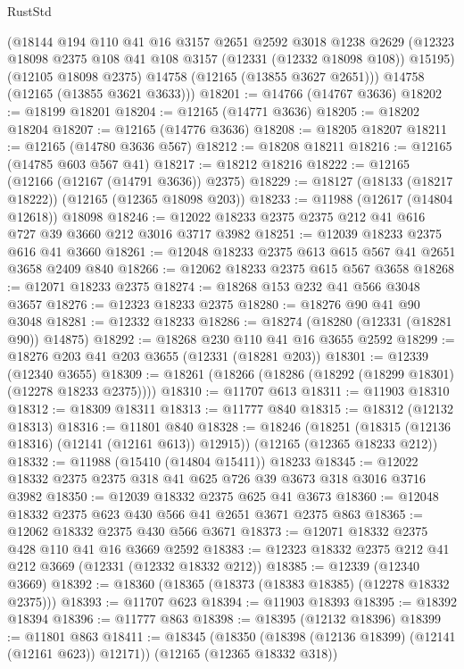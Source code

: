 \begin{lexlean}{RustStd}
\begin{coremodule}
      (@18144
        @194
        @110
        @41
        @16
        @3157
        @2651
        @2592
        @3018
        @1238
        @2629
        (@12323 @18098 @2375 @108 @41 @108 @3157 (@12331 (@12332 @18098 @108)) @15195)
        (@12105 @18098 @2375)
        @14758
        (@12165 (@13855 @3627 @2651)))
      @14758
      (@12165 (@13855 @3621 @3633)))
@18201 := @14766 (@14767 @3636)
@18202 := @18199 @18201
@18204 := @12165 (@14771 @3636)
@18205 := @18202 @18204
@18207 := @12165 (@14776 @3636)
@18208 := @18205 @18207
@18211 := @12165 (@14780 @3636 @567)
@18212 := @18208 @18211
@18216 := @12165 (@14785 @603 @567 @41)
@18217 := @18212 @18216
@18222 := @12165 (@12166 (@12167 (@14791 @3636)) @2375)
@18229 := @18127 (@18133 (@18217 @18222)) (@12165 (@12365 @18098 @203))
@18233 := @11988 (@12617 (@14804 @12618)) @18098
@18246 := @12022 @18233 @2375 @2375 @212 @41 @616 @727 @39 @3660 @212 @3016 @3717 @3982
@18251 := @12039 @18233 @2375 @616 @41 @3660
@18261 := @12048 @18233 @2375 @613 @615 @567 @41 @2651 @3658 @2409 @840
@18266 := @12062 @18233 @2375 @615 @567 @3658
@18268 := @12071 @18233 @2375
@18274 := @18268 @153 @232 @41 @566 @3048 @3657
@18276 := @12323 @18233 @2375
@18280 := @18276 @90 @41 @90 @3048
@18281 := @12332 @18233
@18286 := @18274 (@18280 (@12331 (@18281 @90)) @14875)
@18292 := @18268 @230 @110 @41 @16 @3655 @2592
@18299 := @18276 @203 @41 @203 @3655 (@12331 (@18281 @203))
@18301 := @12339 (@12340 @3655)
@18309 := @18261 (@18266 (@18286 (@18292 (@18299 @18301) (@12278 @18233 @2375))))
@18310 := @11707 @613
@18311 := @11903 @18310
@18312 := @18309 @18311
@18313 := @11777 @840
@18315 := @18312 (@12132 @18313)
@18316 := @11801 @840
@18328 := @18246
    (@18251 (@18315 (@12136 @18316) (@12141 (@12161 @613)) @12915))
    (@12165 (@12365 @18233 @212))
@18332 := @11988 (@15410 (@14804 @15411)) @18233
@18345 := @12022 @18332 @2375 @2375 @318 @41 @625 @726 @39 @3673 @318 @3016 @3716 @3982
@18350 := @12039 @18332 @2375 @625 @41 @3673
@18360 := @12048 @18332 @2375 @623 @430 @566 @41 @2651 @3671 @2375 @863
@18365 := @12062 @18332 @2375 @430 @566 @3671
@18373 := @12071 @18332 @2375 @428 @110 @41 @16 @3669 @2592
@18383 := @12323 @18332 @2375 @212 @41 @212 @3669 (@12331 (@12332 @18332 @212))
@18385 := @12339 (@12340 @3669)
@18392 := @18360 (@18365 (@18373 (@18383 @18385) (@12278 @18332 @2375)))
@18393 := @11707 @623
@18394 := @11903 @18393
@18395 := @18392 @18394
@18396 := @11777 @863
@18398 := @18395 (@12132 @18396)
@18399 := @11801 @863
@18411 := @18345
    (@18350 (@18398 (@12136 @18399) (@12141 (@12161 @623)) @12171))
    (@12165 (@12365 @18332 @318))

\end{coremodule}
\end{lexlean}
